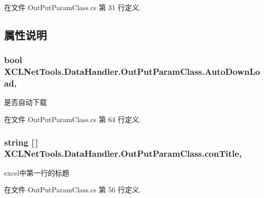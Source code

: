 在文件 Out\-Put\-Param\-Class.\-cs 第 31 行定义.



\subsection{属性说明}
\hypertarget{class_x_c_l_net_tools_1_1_data_handler_1_1_out_put_param_class_a1e1c3490df66e969da5c506f62e39c40}{
\subsubsection[{Auto\-Down\-Load}]{\setlength{\rightskip}{0pt plus 5cm}bool X\-C\-L\-Net\-Tools.\-Data\-Handler.\-Out\-Put\-Param\-Class.\-Auto\-Down\-Load\hspace{0.3cm}{\ttfamily [get]}, {\ttfamily [set]}}}\label{class_x_c_l_net_tools_1_1_data_handler_1_1_out_put_param_class_a1e1c3490df66e969da5c506f62e39c40}


是否自动下载 



在文件 Out\-Put\-Param\-Class.\-cs 第 64 行定义.

\hypertarget{class_x_c_l_net_tools_1_1_data_handler_1_1_out_put_param_class_a748b563923eab10a0c8f5434fb5a3b16}{
\subsubsection[{con\-Title}]{\setlength{\rightskip}{0pt plus 5cm}string \mbox{[}$\,$\mbox{]} X\-C\-L\-Net\-Tools.\-Data\-Handler.\-Out\-Put\-Param\-Class.\-con\-Title\hspace{0.3cm}{\ttfamily [get]}, {\ttfamily [set]}}}\label{class_x_c_l_net_tools_1_1_data_handler_1_1_out_put_param_class_a748b563923eab10a0c8f5434fb5a3b16}


excel中第一行的标题 



在文件 Out\-Put\-Param\-Class.\-cs 第 56 行定义.

